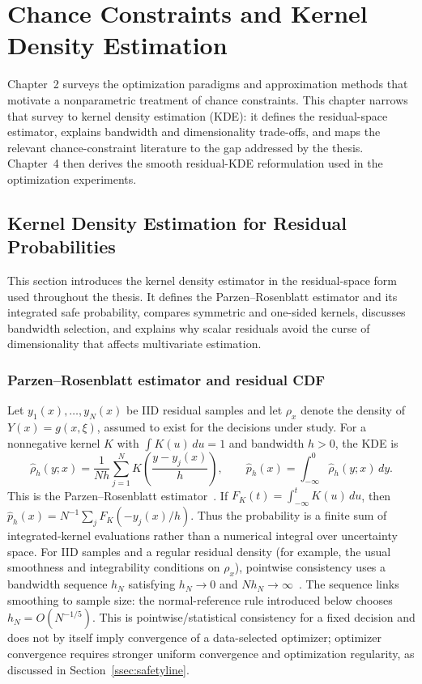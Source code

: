 \graphicspath{{kap03/figures/}{./figures/}}
\section{Chance Constraints and Kernel Density Estimation}
\label{ch:kde}

Chapter~2 surveys the optimization paradigms and approximation methods that motivate a nonparametric treatment of chance constraints. This chapter narrows that survey to kernel density estimation (KDE): it defines the residual-space estimator, explains bandwidth and dimensionality trade-offs, and maps the relevant chance-constraint literature to the gap addressed by the thesis. Chapter~4 then derives the smooth residual-KDE reformulation used in the optimization experiments.

\subsection{Kernel Density Estimation for Residual Probabilities}
\label{sec:kde}

This section introduces the kernel density estimator in the residual-space form used throughout the thesis. It defines the Parzen--Rosenblatt estimator and its integrated safe probability, compares symmetric and one-sided kernels, discusses bandwidth selection, and explains why scalar residuals avoid the curse of dimensionality that affects multivariate estimation.

\subsubsection{Parzen--Rosenblatt estimator and residual CDF}
\label{ssec:parzen}

Let $y_1(x),\ldots,y_N(x)$ be IID residual samples and let $\rho_x$ denote the density of $Y(x)=g(x,\xi)$, assumed to exist for the decisions under study. For a nonnegative kernel $K$ with $\int K(u)\,du=1$ and bandwidth $h>0$, the KDE is
\begin{equation}
 \hat\rho_h(y;x)=\frac{1}{Nh}\sum_{j=1}^N K\!\left(\frac{y-y_j(x)}{h}\right),
 \qquad
 \hat p_h(x)=\int_{-\infty}^{0}\hat\rho_h(y;x)\,dy.
 \label{eq:ch3-kde}
\end{equation}
This is the Parzen--Rosenblatt estimator~\citep{rosenblatt1956,parzen1962}. If $F_K(t)=\int_{-\infty}^tK(u)\,du$, then $\hat p_h(x)=N^{-1}\sum_jF_K(-y_j(x)/h)$. Thus the probability is a finite sum of integrated-kernel evaluations rather than a numerical integral over uncertainty space. For IID samples and a regular residual density (for example, the usual smoothness and integrability conditions on $\rho_x$), pointwise consistency uses a bandwidth sequence $h_N$ satisfying $h_N\to0$ and $Nh_N\to\infty$~\citep{parzen1962,devroye1985}. The sequence links smoothing to sample size: the normal-reference rule introduced below chooses $h_N=O(N^{-1/5})$. This is pointwise/statistical consistency for a fixed decision and does not by itself imply convergence of a data-selected optimizer; optimizer convergence requires stronger uniform convergence and optimization regularity, as discussed in Section~\ref{ssec:safetyline}.

